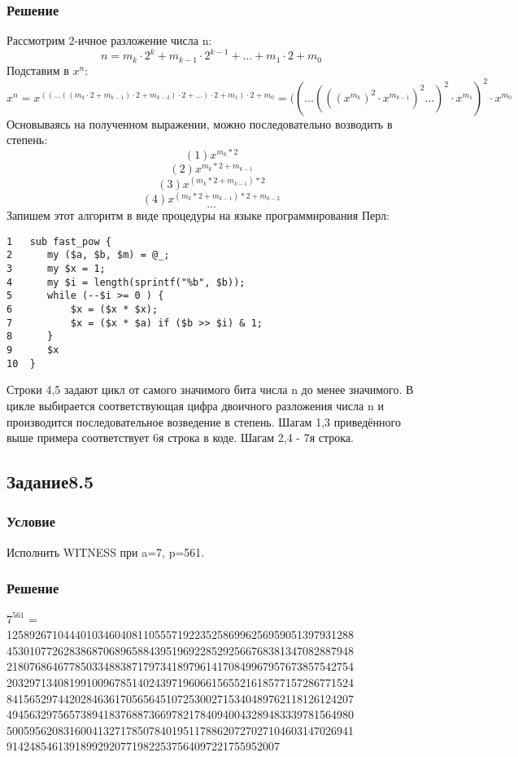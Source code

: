 \documentclass[10pt,a4paper]{article}
\begin{document}
\subsubsection*{Решение}
Рассмотрим 2-ичное разложение числа n:
$$    n=m_{k} \cdot 2^{k}+m_{k-1} \cdot 2^{k-1}+\dots+m_{1} \cdot 2+m_{0} $$
Подставим в  $ x^n $:
$$  x^{n}=x^{((\dots((m_{k} \cdot 2+m_{k-1}) \cdot 2+m_{k-2}) \cdot
  2+\dots) \cdot 2+m_{1}) \cdot 2 + m_{0}}=((\dots(((x^{m_{k}})^{2}
\cdot x^{m_{k-1}})^{2}\dots)^{2} \cdot x^{m_{1}})^2 \cdot x^{m_{0}} $$
Основываясь на полученном выражении, можно последовательно возводить в
степень:
$$(1) x^{m_k*2} $$
$$(2) x^{m_k*2 + m_{k-1}} $$
$$(3) x^{(m_k*2 + m_{k-1})*2} $$
$$(4) x^{(m_k*2 + m_{k-1})*2 + m_{k-2}} $$
$$...$$
Запишем этот алгоритм в виде процедуры на языке программирования Перл:
\begin{lstlisting}
1   sub fast_pow {
2      my ($a, $b, $m) = @_;
3      my $x = 1;
4      my $i = length(sprintf("%b", $b));
5      while (--$i >= 0 ) {
6          $x = ($x * $x);
7          $x = ($x * $a) if ($b >> $i) & 1;
8      }
9      $x
10  }
\end{lstlisting}
Строки 4,5 задают цикл от самого значимого бита числа n до менее
значимого. В цикле выбирается соответствующая цифра двоичного разложения
числа n и производится последовательное возведение в степень. Шагам
1,3 приведённого выше примера соответствует 6я строка в коде. Шагам
2,4 - 7я строка.

\subsection*{Задание8.5}
\subsubsection*{Условие}
Исполнить WITNESS при a=7, p=561.
\subsubsection*{Решение}
$ 7^{561} $ =\\
1258926710444010346040811055571922352586996256959051397931288\\
4530107726283868706896588439519692285292566768381347082887948\\
2180768646778503348838717973418979614170849967957673857542754\\
2032971340819910096785140243971960661565521618577157286771524\\
8415652974420284636170565645107253002715340489762118126124207\\
4945632975657389418376887366978217840940043289483339781564980\\
5005956208316004132717850784019511788620727027104603147026941\\
914248546139189929207719822537564097221755952007\\
\end{document}
